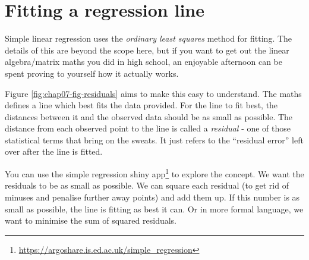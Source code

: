 \documentclass[12pt,]{krantz}
\renewcommand{\href}[2]{#2\footnote{\url{#1}}}
\theoremstyle{definition}
\theoremstyle{definition}
\theoremstyle{definition}
\theoremstyle{remark}
\begin{document}
\hypertarget{fitting-a-regression-line}{%
\section{Fitting a regression line}\label{fitting-a-regression-line}}

Simple linear regression uses the \emph{ordinary least squares} method
for fitting. The details of this are beyond the scope here, but if you
want to get out the linear algebra/matrix maths you did in high school,
an enjoyable afternoon can be spent proving to yourself how it actually
works.

Figure \ref{fig:chap07-fig-residuals} aims to make this easy to
understand. The maths defines a line which best fits the data provided.
For the line to fit best, the distances between it and the observed data
should be as small as possible. The distance from each observed point to
the line is called a \emph{residual} - one of those statistical terms
that bring on the sweats. It just refers to the ``residual error'' left
over after the line is fitted.

You can use the
\href{https://argoshare.is.ed.ac.uk/simple_regression}{simple regression
shiny app} to explore the concept. We want the residuals to be as small
as possible. We can square each residual (to get rid of minuses and
penalise further away points) and add them up. If this number is as
small as possible, the line is fitting as best it can. Or in more formal
language, we want to minimise the sum of squared residuals.
\end{document}
